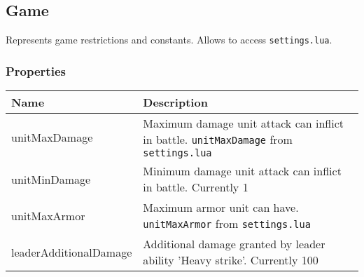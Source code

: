 \subsection{Game}
\label{Game}
Represents game restrictions and constants. Allows to access \texttt{settings.lua}.
\subsubsection{Properties}
\begin{center}
\begin{tabularx}{\linewidth}{| l | X |}
\hline
\textbf{Name} & \textbf{Description} \\
\hline
unitMaxDamage & Maximum damage unit attack can inflict in battle. \texttt{unitMaxDamage} from \texttt{settings.lua}\\
\hline
unitMinDamage & Minimum damage unit attack can inflict in battle. Currently 1\\
\hline
unitMaxArmor & Maximum armor unit can have. \texttt{unitMaxArmor} from \texttt{settings.lua}\\
\hline
leaderAdditionalDamage & Additional damage granted by leader ability 'Heavy strike'. Currently 100\\
\hline
\end{tabularx}
\end{center}
